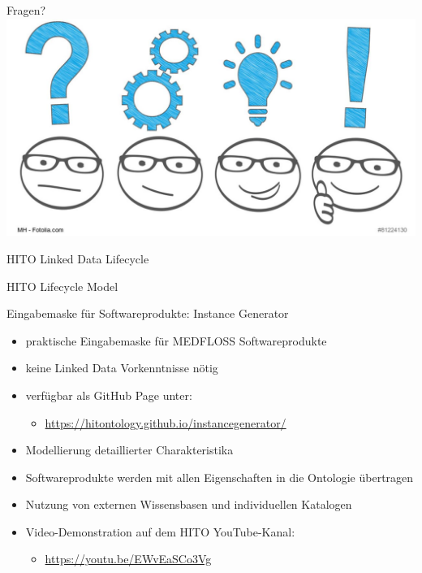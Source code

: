 \documentclass[aspectratio=1610,12pt]{beamer}
\begin{document}
\begin{frame}{Fragen?}
  \centering
  \vspace{-0.5cm}
  \includegraphics[width=\textwidth]{img/fragen.png}
\end{frame}

\begin{frame}{HITO Linked Data Lifecycle}
  \centering
  \vspace{-0.5cm}
\end{frame}

\begin{frame}{HITO Lifecycle Model}
 \centering
  \vspace{-0.5cm}
\end{frame}

\begin{frame}{Eingabemaske für Softwareprodukte: Instance Generator}
\begin{spacing}{1.25}
\begin{itemize}
\item praktische Eingabemaske für MEDFLOSS Softwareprodukte
\item keine Linked Data Vorkenntnisse nötig
\item verfügbar als GitHub Page unter:
\begin{itemize}
\item \url{https://hitontology.github.io/instancegenerator/}
\end{itemize}
\item Modellierung detaillierter Charakteristika
\item Softwareprodukte werden mit allen Eigenschaften in die Ontologie übertragen
\item Nutzung von externen Wissensbasen und individuellen Katalogen
\item Video-Demonstration auf dem HITO YouTube-Kanal:
\begin{itemize}
\item \url{https://youtu.be/EWvEaSCo3Vg}
\end{itemize}
\end{itemize}
\end{spacing}
\end{frame}
\end{document}
